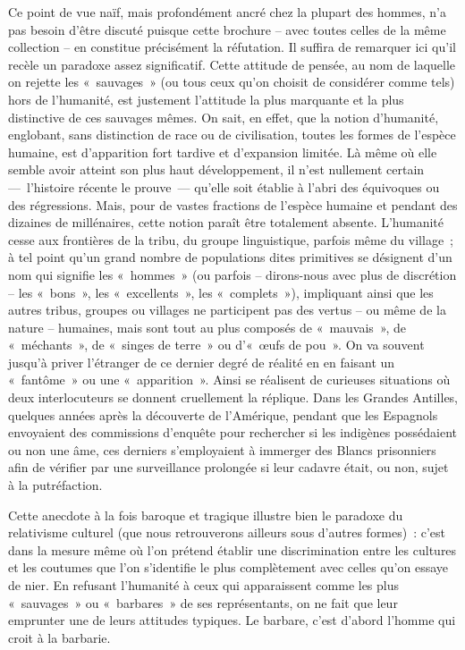 \documentclass[french,twoside]{book} %
\begin{document}
Ce point de vue naïf, mais profondément ancré chez la plupart des hommes, n’a pas besoin d’être discuté puisque cette brochure – avec toutes celles de la même collection – en constitue précisément la réfutation. Il suffira de remarquer ici qu’il recèle un paradoxe assez significatif. Cette attitude de pensée, au nom de laquelle on rejette les « sauvages » (ou tous ceux qu’on choisit de considérer comme tels) hors de l’humanité, est justement l’attitude la plus marquante et la plus distinctive de ces sauvages mêmes. On sait, en effet, que la notion d’humanité, englobant, sans distinction de race ou de civilisation, toutes les formes de l’espèce humaine, est d’apparition fort tardive et d’expansion limitée. Là même où elle semble avoir atteint son plus haut développement, il n’est nullement certain — l’histoire récente le prouve — qu’elle soit établie à l’abri des équivoques ou des régressions. Mais, pour de vastes fractions de l’espèce humaine et pendant des dizaines de millénaires, cette notion paraît être totalement absente. L’humanité cesse aux frontières de la tribu, du groupe linguistique, parfois même du village ; à tel point qu’un grand nombre de populations dites primitives se désignent d’un nom qui signifie les « hommes » (ou parfois – dirons-nous avec plus de discrétion – les « bons », les « excellents », les « complets »), impliquant ainsi que les autres tribus, groupes ou villages ne participent pas des vertus – ou même de la nature – humaines, mais sont tout au plus composés de « mauvais », de « méchants », de « singes de terre » ou d’« œufs de pou ». On va souvent jusqu’à priver l’étranger de ce dernier degré de réalité en en faisant un « fantôme » ou une « apparition ». Ainsi se réalisent de curieuses situations où deux interlocuteurs se donnent cruellement la réplique. Dans les Grandes Antilles, quelques années après la découverte de l’Amérique, pendant que les Espagnols envoyaient des commissions d’enquête pour rechercher si les indigènes possédaient ou non une âme, ces derniers s’employaient à immerger des Blancs prisonniers afin de vérifier par une surveillance prolongée si leur cadavre était, ou non, sujet à la putréfaction.\par
Cette anecdote à la fois baroque et tragique illustre bien le paradoxe du relativisme culturel (que nous retrouverons ailleurs sous d’autres formes) : c’est dans la mesure même où l’on prétend établir une discrimination entre les cultures et les coutumes que l’on s’identifie le plus complètement avec celles qu’on essaye de nier. En refusant l’humanité à ceux qui apparaissent comme les plus « sauvages » ou « barbares » de ses représentants, on ne fait que leur emprunter une de leurs attitudes typiques. Le barbare, c’est d’abord l’homme qui croit à la barbarie.\par
\end{document}
